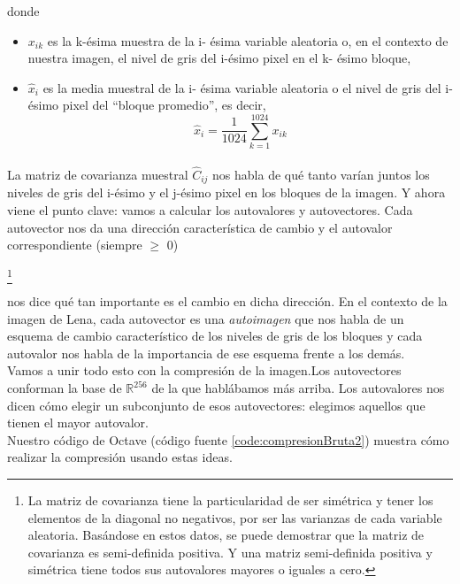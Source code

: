 \documentclass[twocolumn,a4paper,10pt]{article}
\begin{document}
donde
\begin{itemize}
    \item $x_{ik}$ es la k-\'esima muestra de la i- \'esima variable aleatoria o, en el contexto de nuestra imagen, el nivel de gris del i-\'esimo pixel en el 
    k- \'esimo bloque,
    \item $\widehat{x}_{i}$ es la media muestral de la i- \'esima variable aleatoria o el nivel de gris del i-\'esimo pixel del “bloque promedio”, es decir,
    \[ \widehat{x}_{i} = \frac{1}{1024} \sum_{k=1}^{1024} x_{ik} \]
\end{itemize}

\paragraph*{}

La matriz de covarianza muestral $\widehat{C}_{ij}$ nos habla de qu\'e tanto var\'ian juntos los niveles de gris del i-\'esimo y el j-\'esimo pixel en los bloques 
de la imagen. Y ahora viene  el punto clave: vamos a calcular los autovalores y autovectores. Cada autovector nos da una direcci\'on caracter\'istica de cambio y 
el autovalor correspondiente  (siempre $\geq$ 0) 

\footnote{La matriz de covarianza tiene la particularidad de ser sim\'etrica y tener los elementos de la diagonal no negativos, por ser las 
varianzas de cada variable aleatoria. Bas\'andose en estos datos, se puede demostrar que la matriz de covarianza es semi-definida positiva. Y una matriz semi-definida 
positiva y sim\'etrica tiene todos sus autovalores mayores o iguales a cero.}

 nos dice qu\'e tan importante es el cambio en dicha direcci\'on. En el contexto de la imagen de Lena, cada autovector es una \textit{autoimagen}
que nos habla de un esquema de cambio caracter\'istico de los niveles de gris de los bloques y cada autovalor nos habla de la importancia de ese esquema frente 
a los dem\'as. \\

Vamos a unir todo esto con la compresi\'on de la imagen.Los autovectores conforman la base de $\mathbb{R}^{256}$ de la que habl\'abamos m\'as arriba. 
Los autovalores nos dicen c\'omo elegir un subconjunto de esos autovectores: elegimos aquellos que tienen el mayor autovalor. \\

Nuestro c\'odigo de Octave (c\'odigo fuente \ref{code:compresionBruta2}) muestra c\'omo realizar la compresi\'on usando estas ideas. \\
\end{document}
